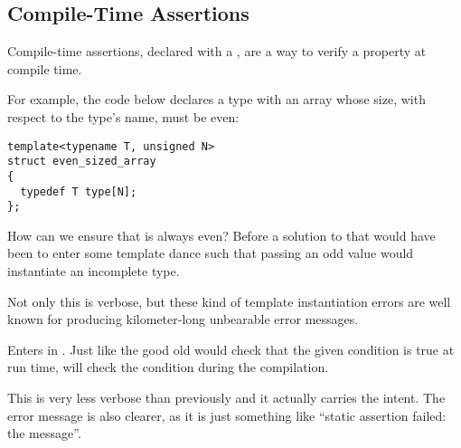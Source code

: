 \subsection{Compile-Time Assertions}

Compile-time assertions, declared with a , are a
way to verify a property at compile time.

For example, the code below declares a type with an array whose size,
with respect to the type's name, must be even:

\begin{lstlisting}
template<typename T, unsigned N>
struct even_sized_array
{
  typedef T type[N];
};
\end{lstlisting}

How can we ensure that  is always even? Before  a
solution to that would have been to enter some template dance such
that passing an odd value would instantiate an incomplete type.



Not only this is verbose, but these kind of template instantiation
errors are well known for producing kilometer-long unbearable error
messages.

\bigskip

Enters  in . Just like the good old
 would check that the given condition is true
at run time,  will check the
condition during the compilation.



This is very less verbose than previously and it actually carries the
intent. The error message is also clearer, as it is just something
like ``static assertion failed: the message''.
